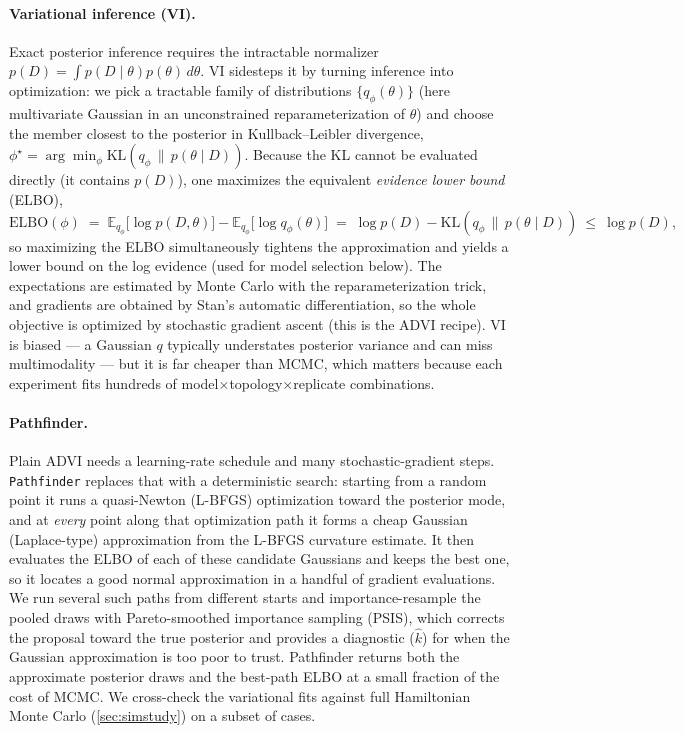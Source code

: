 \documentclass[12pt]{article}
\theoremstyle{definition}
\theoremstyle{definition}
\theoremstyle{lemma}
\theoremstyle{remark}
\theoremstyle{definition}
\begin{document}
\paragraph{Variational inference (VI).}
Exact posterior inference requires the intractable normalizer
$p(D)=\int p(D\mid\theta)p(\theta)\,d\theta$. VI sidesteps it by turning
inference into optimization: we pick a tractable family of distributions
$\{q_\phi(\theta)\}$ (here multivariate Gaussian in an unconstrained
reparameterization of $\theta$) and choose the member closest to the posterior in
Kullback--Leibler divergence, $\phi^\star=\arg\min_\phi
\mathrm{KL}\!\left(q_\phi\,\|\,p(\theta\mid D)\right)$. Because the KL cannot be
evaluated directly (it contains $p(D)$), one maximizes the equivalent
\emph{evidence lower bound} (ELBO),
\[
  \mathrm{ELBO}(\phi)
  \;=\; \mathbb{E}_{q_\phi}\!\big[\log p(D,\theta)\big] - \mathbb{E}_{q_\phi}\!\big[\log q_\phi(\theta)\big]
  \;=\; \log p(D) - \mathrm{KL}\!\left(q_\phi\,\|\,p(\theta\mid D)\right)\ \le\ \log p(D),
\]
so maximizing the ELBO simultaneously tightens the approximation and yields a
lower bound on the log evidence (used for model selection below). The
expectations are estimated by Monte Carlo with the reparameterization trick, and
gradients are obtained by Stan's automatic differentiation, so the whole
objective is optimized by stochastic gradient ascent (this is the ADVI recipe).
VI is biased --- a Gaussian $q$ typically understates posterior variance and can
miss multimodality --- but it is far cheaper than MCMC, which matters because each
experiment fits hundreds of model$\times$topology$\times$replicate combinations.

\paragraph{Pathfinder.}
Plain ADVI needs a learning-rate schedule and many stochastic-gradient steps.
\texttt{Pathfinder} replaces that with a deterministic search: starting from a
random point it runs a quasi-Newton (L-BFGS) optimization toward the posterior
mode, and at \emph{every} point along that optimization path it forms a cheap
Gaussian (Laplace-type) approximation from the L-BFGS curvature estimate. It then
evaluates the ELBO of each of these candidate Gaussians and keeps the best one,
so it locates a good normal approximation in a handful of gradient evaluations.
We run several such paths from different starts and importance-resample the pooled
draws with Pareto-smoothed importance sampling (PSIS), which corrects the
proposal toward the true posterior and provides a diagnostic ($\hat k$) for when
the Gaussian approximation is too poor to trust. Pathfinder returns both the
approximate posterior draws and the best-path ELBO at a small fraction of the
cost of MCMC. We cross-check the variational fits against full Hamiltonian Monte
Carlo (\cref{sec:simstudy}) on a subset of cases.
\end{document}
